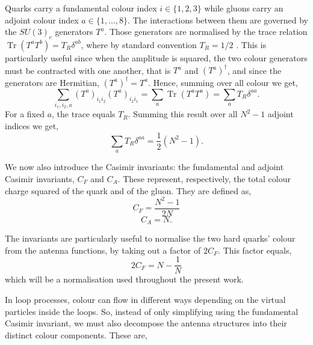 Quarks carry a fundamental colour index $i\in\{1,2,3\}$ while gluons carry an 
adjoint colour index $a\in\{1,...,8\}$. The interactions between them are governed 
by the $SU(3)_c$ generators $T^a$. Those generators are normalised by the trace
relation $\operatorname{Tr}\left(T^aT^b\right)=T_R\delta^{ab}$, where by standard 
convention $T_R=1/2$ \cite{Ellis:1996mzs,Schwartz:2014sze}. 
This is particularly useful since when the amplitude is 
squared, the two colour generators must be contracted with one another, that is
$T^a$ and $\left(T^a\right)^\dagger$, and since the generators are Hermitian, 
$\left(T^a\right)^\dagger=T^a$. Hence, summing over all colour we get,
\begin{equation}\label{eq:colourSum}
    \sum_{i_1,i_2,a}\left(T^a\right)_{i_1i_2}\left(T^a\right)_{i_2i_1}=\sum_a\operatorname{Tr}\left(T^aT^a\right)=\sum_aT_R\delta^{aa}.
\end{equation}
For a fixed $a$, the trace equals $T_R$. Summing this result over all $N^2-1$ 
adjoint indices we get,
\begin{equation}
    \sum_a T_R\delta^{aa}=\frac12\left(N^2-1\right).
\end{equation}

We now also introduce the Casimir invariants: the fundamental and adjoint Casimir
invariants, $C_F$ and $C_A$. These represent, respectively, the total colour 
charge squared of the quark and of the gluon. They are defined as,
\begin{equation*}
    C_F=\frac{N^2-1}{2N}
\end{equation*}
\begin{equation*}
    C_A=N.
\end{equation*}

The invariants are particularly useful to normalise the two hard quarks' colour
from the antenna functions, by taking out a factor of $2C_F$. This factor equals,
\begin{equation}\label{eq:colourNorm}
    2C_F=N-\frac1N
\end{equation}
which will be a normalisation used throughout the present work. 

In loop processes, colour can flow in different ways depending on the virtual 
particles inside the loops. So, instead of only simplifying using the
fundamental Casimir invariant, we must also decompose the antenna structures into 
their distinct colour components. These are,

